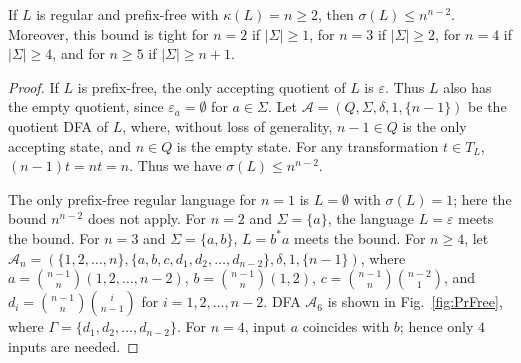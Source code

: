\documentclass{llncs}
\renewcommand{\le}{\leqslant}
\renewcommand{\ge}{\geqslant}
\newcommand{\eps}{\varepsilon}
\newcommand{\emp}{\emptyset}
\newcommand{\Sig}{\Sigma}
\newcommand{\sig}{\sigma}
\newcommand{\cA}{{\mathcal A}}
\begin{document}
\begin{theorem}
\label{thm:prefix-free}
If $L$ is regular and prefix-free with $\kappa(L)=n\ge 2$, then $\sig(L)\le n^{n-2}$. Moreover, this bound is tight 
for $n=2$  if $|\Sig|\ge 1$, for $n=3$  if $|\Sig|\ge 2$, for $n=4$ if $|\Sig|\ge 4$, and for $n\ge 5$
if $|\Sig|\ge n+1$.
\end{theorem}
\begin{proof}
If $L$ is prefix-free, the only accepting quotient of $L$ is $\eps$. Thus $L$ also has the empty quotient, since $\eps_a = \emptyset$ for  $a \in \Sig$. 
Let $\cA = (Q, \Sig, \delta, 1, \{n-1\})$ be the quotient DFA of $L$, where, without loss of generality,  $n-1 \in Q$ is the only accepting state, and  $n \in Q$ is the empty state. For any transformation $t \in T_L$, $(n-1) t =n t = n$. Thus we have $\sig(L)\le n^{n-2}$.

The only prefix-free regular language for $n=1$ is $L=\emp$ with $\sig(L)=1$; here the bound $n^{n-2}$ does not apply. 
For $n=2$ and $\Sig=\{a\}$, the language $L=\eps$ meets the bound.
For $n=3$ and $\Sig=\{a,b\}$,  $L=b^*a$ meets the bound.
For $n\ge 4$, let $\cA_n=(\{1, 2,\ldots, n\}, \{a,b,c,d_1,d_2,\ldots,d_{n-2}\},\delta,1,\{n-1\})$, where $a={{n-1} \choose n} (1,2,\ldots,n-2)$, $b={{n-1} \choose n} (1,2)$, $c={{n-1} \choose n} {n-2\choose 1}$, and $d_i={{n-1} \choose n} {i\choose n-1}$ for $i=1,2,\ldots,n-2$.
DFA $\cA_6$ is shown in Fig.~\ref{fig:PrFree}, 
where $\Gamma = \{d_1,d_2,\ldots,d_{n-2}\}$.
For $n=4$,  input $a$ coincides with $b$; hence only $4$ inputs are needed. 


\end{proof}
\end{document}
